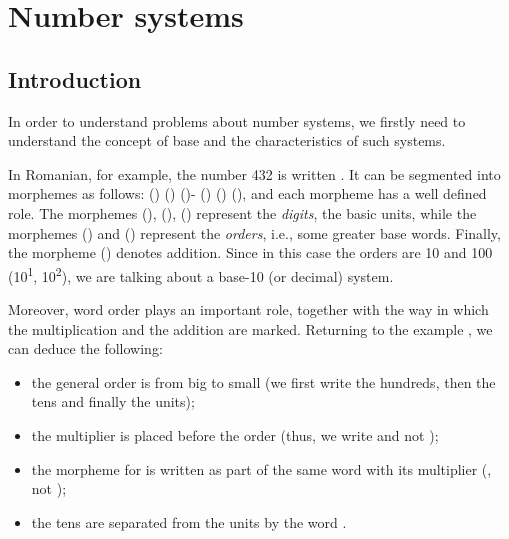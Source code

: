\begin{refsection}
\hypertarget{numbers}{%
\chapter{Number systems}\label{chap-numbers}}

\hypertarget{introduction}{%
\section{Introduction}}

 In order to understand problems about number systems, we firstly need to understand the concept of base and the characteristics of such systems.

In Romanian, for example, the number 432 is written . It can be segmented into morphemes as follows:  ()  ()  ()- ()  ()  (), and each morpheme has a well defined role. The morphemes   (),  (),  () represent the \textit{digits}, the basic units, while the morphemes  () and  () represent the \textit{orders}, i.e., some greater base words. Finally, the morpheme  () denotes addition. Since in this case the orders are 10 and 100 (10\textsuperscript{1}, 10\textsuperscript{2}), we are talking about a base-10 (or decimal) system.

Moreover, word order plays an important role, together with the way in which the multiplication and the addition are marked. Returning to the example , we can deduce the following:

\begin{itemize}
    \item the general order is from big to small (we first write the hundreds, then the tens and finally the units);
    \item the multiplier is placed before the order (thus, we write  and not );
    \item the morpheme for  is written as part of the same word with its multiplier (, not );
    \item the tens are separated from the units by the word .
\end{itemize}


\end{refsection}
